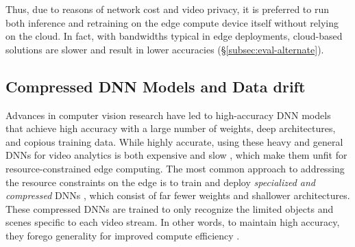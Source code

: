 Thus, due to reasons of network cost and video privacy, it is preferred to run both inference and retraining on the edge compute device itself without relying on the cloud. In fact, with bandwidths typical in edge deployments, cloud-based solutions are slower and result in lower accuracies (\S\ref{subsec:eval-alternate}).

\subsection{Compressed DNN Models and Data drift}
\label{subsec:continuous}

Advances in computer vision research have led to high-accuracy DNN models that %
achieve high accuracy with a large number of weights, deep architectures, and copious training data. While highly accurate, using these heavy and general DNNs for video analytics is both expensive and slow \cite{noscope, DBLP:conf/osdi/HsiehABVBPGM18}, which make them unfit for resource-constrained edge computing. The most common approach to addressing the resource constraints on the edge is to train and deploy \emph{specialized and compressed} DNNs \cite{compression-4, compression-5, compression-6, compression-17, compression-18, compression-19}, which consist of far fewer weights and shallower architectures.  These compressed DNNs are trained to only recognize the limited objects and scenes specific to each video stream. In other words, to maintain high accuracy, they forego generality for improved compute efficiency \cite{noscope, DBLP:conf/osdi/HsiehABVBPGM18, mullapudi2019}. 


